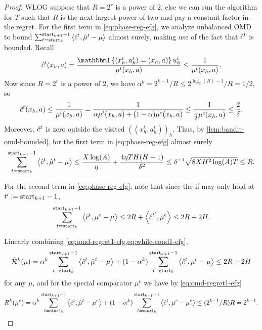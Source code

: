 \begin{proof}
    WLOG suppose that $R=2^r$ is a power of $2$, else we can run the algorithm for $T$ such that $R$ is the next largest power of two and pay a constant factor in the regret. For the first term in \cref{eq:phase-reg-efg}, we analyze unbalanced OMD to bound $\sum_{t=\text{start}_{k}}^{\text{start}_{k+1}-1} \left\langle \hat{c}^t, \hat{\mu}^t-\mu \right\rangle$ almost surely, making use of the fact that $\hat{c}^t$ is bounded. Recall 
    \begin{align*}
        \cHat^t(x_{h},a) = \frac{\indicator{(x_{h}^t,a_{h}^t)=(x_{h},a)}u^t_h}{\mu^t(x_{h},a)} \leq \frac{1}{\mu^t(x_{h},a)}.
    \end{align*}
    Now since $R=2^r$ is a power of $2$, we have $\alpha^k = 2^{k-1}/R \leq 2^{\log_2(R)-1}/R=1/2$, so 
    \begin{align*}
        \hat{c}^t(x_h,a) \leq \frac{1}{\mu^t(x_{h},a)}=\frac{1}{\alpha\mu^t(x_{h},a)+(1-\alpha)\mu^c(x_{h},a)}\leq \frac{1}{\frac{1}{2}\mu^c(x_{h},a)} \leq\frac{2}{\delta}.
    \end{align*}
    Moreover, $\hat{c}^t$ is zero outside the visited $((x_h^t,a_h^t))_h$. Thus, by \cref{lem:bandit-omd-bounded}, for the first term in \cref{eq:phase-reg-efg} almost surely
    \begin{align}
        \sum_{t=\text{start}_{k}}^{\text{start}_{k+1}-1} \left\langle \hat{c}^t, \hat{\mu}^t-\mu \right\rangle \leq \frac{X\log(A)}{\eta} + \frac{4 \eta TH(H+1)}{\delta^2} \leq \delta^{-1}\sqrt{8XH^2\log(A) T} \leq R. \label{eq:omd-regret1-efg}
    \end{align}

    \noindent For the second term in \cref{eq:phase-reg-efg}, note that since the if may only hold at $t':=\text{start}_{k+1}-1$,
    \begin{align}
        \sum_{t=\text{start}_{k}}^{\text{start}_{k+1}-1} \left\langle \hat{c}^t, \mu^c-\mu \right\rangle \leq 2R+\left\langle \hat{c}^{t'}, \mu^c \right\rangle\leq 2R+2H. \label{eq:while-cond1-efg}
    \end{align}

    \noindent Linearly combining \cref{eq:omd-regret1-efg,eq:while-cond1-efg},
    \begin{align*}
        \hat{\mathcal{R}}^k(\mu) = \alpha^k \sum_{t=\text{start}_{k}}^{\text{start}_{k+1}-1} \left\langle \hat{c}^t, \hat{\mu}^t-\mu \right\rangle + (1-\alpha^k) \sum_{t=\text{start}_k}^{\text{start}_{k+1}-1} \left\langle \hat{c}^t, \mu^c-\mu \right\rangle \leq 2R +2H
    \end{align*}
    for any $\mu$, and for the special comparator $\mu^c$ we have by \cref{eq:omd-regret1-efg}
    \begin{align*}
        R^k(\mu^c)= \alpha^k \sum_{t=\text{start}_{k}}^{\text{start}_{k+1}-1} \left\langle \hat{c}^t, \hat{\mu}^t-\mu^c \right\rangle + (1-\alpha^k) \sum_{t=\text{start}_{k}}^{\text{start}_{k+1}-1} \left\langle \hat{c}^t, \mu^c-\mu^c \right\rangle \leq (2^{k-1}/R)R = 2^{k-1}. 
    \end{align*}
\end{proof}

